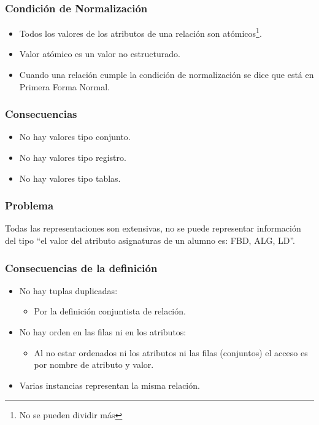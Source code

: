 \subsubsection*{Condición de Normalización}

\begin{itemize}
    \item Todos los valores de los atributos de una relación son atómicos\footnote{No se pueden dividir más}.
    \item Valor atómico es un valor no estructurado.
    \item Cuando una relación cumple la condición de normalización se dice que está en Primera Forma Normal.
\end{itemize}

\subsubsection*{Consecuencias}

\begin{itemize}
    \item No hay valores tipo conjunto.
    \item No hay valores tipo registro.
    \item No hay valores tipo tablas.
\end{itemize}

\subsubsection*{Problema}

Todas las representaciones son extensivas, no se puede representar información del tipo “el valor del atributo asignaturas de un alumno es: FBD, ALG, LD”.


\subsubsection*{Consecuencias de la definición}

\begin{itemize}
    \item No hay tuplas duplicadas:
    \begin{itemize}
        \item Por la definición conjuntista de relación.
    \end{itemize}
    \item No hay orden en las filas ni en los atributos:
    \begin{itemize}
        \item Al no estar ordenados ni los atributos ni las filas (conjuntos) el acceso es por nombre de atributo y valor.
    \end{itemize}
    \item Varias instancias representan la misma relación.
\end{itemize}

